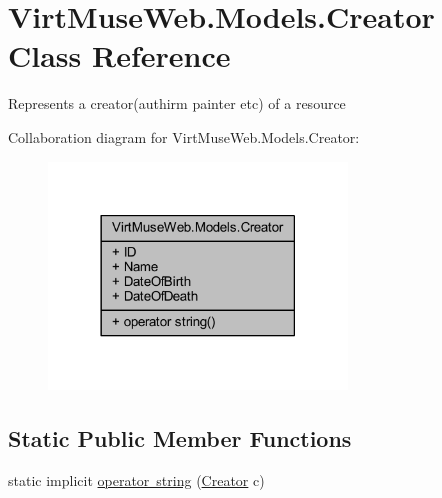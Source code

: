 \hypertarget{class_virt_muse_web_1_1_models_1_1_creator}{}\section{Virt\+Muse\+Web.\+Models.\+Creator Class Reference}
\label{class_virt_muse_web_1_1_models_1_1_creator}


Represents a creator(authirm painter etc) of a resource  




Collaboration diagram for Virt\+Muse\+Web.\+Models.\+Creator\+:
\nopagebreak
\begin{figure}[H]
\begin{center}
\leavevmode
\includegraphics[width=225pt]{class_virt_muse_web_1_1_models_1_1_creator__coll__graph}
\end{center}
\end{figure}
\subsection*{Static Public Member Functions}
\begin{DoxyCompactItemize}
\item 
static implicit \mbox{\hyperlink{class_virt_muse_web_1_1_models_1_1_creator_ad3d2833de2c44e05455711b8a987bcfb}{operator string}} (\mbox{\hyperlink{class_virt_muse_web_1_1_models_1_1_creator}{Creator}} c)
\end{DoxyCompactItemize}
